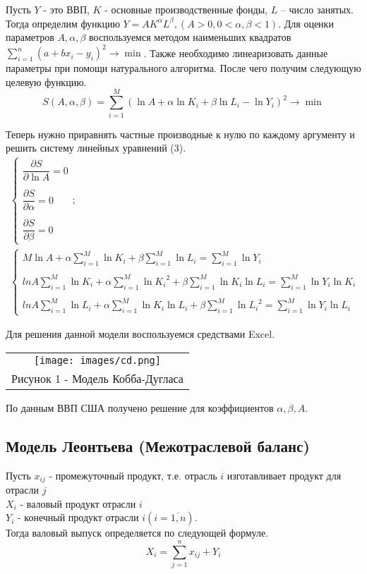 Пусть $Y$ - это ВВП, $K$ - основные производственные фонды, $L$ – число занятых.
Тогда определим функцию $Y=AK^{\alpha} L^{\beta},(A>0,0<\alpha,\beta<1)$.
Для оценки параметров $A,\alpha,\beta$ воспользуемся методом наименьших квадратов $\sum_{i=1}^n(a+b x_i-y_i )^2\to\min$. Также необходимо линеаризовать данные параметры при помощи натурального алгоритма. После чего получим следующую целевую функцию.
\begin{equation}
  S(A,\alpha,\beta)=\sum_{i=1}^M (\ln{A}+\alpha\ln{K_i}+\beta\ln{L_i}-\ln{Y_i})^2 \to\min
\end{equation}

Теперь нужно приравнять частные производные к нулю по каждому аргументу и решить систему линейных уравнений (3).
\begin{gather}
  \begin{cases}
  \dfrac{\partial S}{\partial \ln{A}}=0\\\\
  \dfrac{\partial S}{\partial \alpha}=0\\\\
  \dfrac{\partial S}{\partial \beta}=0
\end{cases};\\
\begin{cases}
  M\ln{A}+\alpha \sum_{i=1}^M\ln{K_i}+\beta \sum_{i=1}^M\ln{L_i}=\sum_{i=1}^M\ln{Y_i}\\\\
  ln{A}\sum_{i=1}^M\ln{K_i}+\alpha \sum_{i=1}^M\ln{K_i}^2+\beta\sum_{i=1}^M\ln{K_i}\ln{L_i}=\sum_{i=1}^M\ln{Y_i}\ln{K_i}\\\\
  ln{A}\sum_{i=1}^M\ln{L_i}+\alpha \sum_{i=1}^M\ln{K_i}\ln{L_i}+\beta\sum_{i=1}^M\ln{L_i}^2=\sum_{i=1}^M\ln{Y_i}\ln{L_i}
  \end{cases}
\end{gather}

Для решения данной модели воспользуемся средствами Excel.
\begin{center}
  \begin{tabular}{c}
    \texttt{[image: images/cd.png]}\\
    Рисунок 1 - Модель Кобба-Дугласа
  \end{tabular}
\end{center}

По данным ВВП США получено решение для коэффициентов $\alpha, \beta, A$.


\subsection{Модель Леонтьева (Межотраслевой баланс)}
Пусть $x_{ij}$ - промежуточный продукт, т.е. отрасль $i$ изготавливает продукт для отрасли $j$\\
$X_i$ - валовый продукт отрасли $i$\\
$Y_i$ - конечный продукт отрасли $i (i=\overline{1,n})$.\\
Тогда валовый выпуск определяется по следующей формуле.
\begin{equation}
X_i=\sum_{j=1}^nx_{ij}+Y_i
\end{equation}

